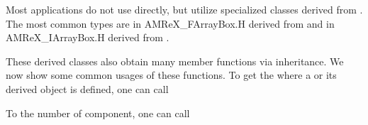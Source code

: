 \documentclass[letterpaper,10pt,english]{sphinxmanual}
\begin{document}
\begin{sphinxVerbatim}[commandchars=\\\{\}]
  
   
 
\end{sphinxVerbatim}

\sphinxAtStartPar
Most applications do not use  directly, but utilize specialized
classes derived from . The most common types are 
in AMReX\_FArrayBox.H derived from  and  in
AMReX\_IArrayBox.H derived from .

\sphinxAtStartPar
These derived classes also obtain many  member functions via
inheritance. We now show some common usages of these functions.  To get the
 where a  or its derived object is defined, one can
call

\begin{sphinxVerbatim}[commandchars=\\\{\}]
   
\end{sphinxVerbatim}

\sphinxAtStartPar
To the number of component, one can call

\begin{sphinxVerbatim}[commandchars=\\\{\}]
  
\end{sphinxVerbatim}
\end{document}
